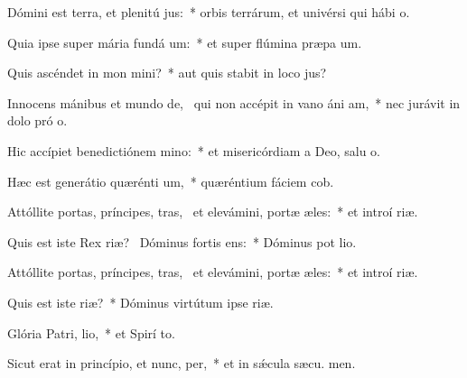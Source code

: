 \item Dómini est terra, et plenitú jus:~* orbis terrárum, et univérsi qui hábi  o.
\item Quia ipse super mária fundá um:~* et super flúmina præpa um.
\item Quis ascéndet in mon mini?~* aut quis stabit in loco  jus?
\item Innocens mánibus et mundo de,~\pscross{} qui non accépit in vano áni am,~* nec jurávit in dolo pró o.
\item Hic accípiet benedictiónem  mino:~* et misericórdiam a Deo, salu o.
\item Hæc est generátio quærénti um,~* quæréntium fáciem  cob.
\item Attóllite portas, príncipes, tras,~\pscross{} et elevámini, portæ æles:~* et introí  riæ.
\item Quis est iste Rex riæ?~\pscross{} Dóminus fortis  ens:~* Dóminus pot  lio.
\item Attóllite portas, príncipes, tras,~\pscross{} et elevámini, portæ æles:~* et introí  riæ.
\item Quis est iste  riæ?~* Dóminus virtútum ipse   riæ.
\item Glória Patri,  lio,~* et Spirí to.
\item Sicut erat in princípio, et nunc,  per,~* et in sǽcula sæcu. men.
